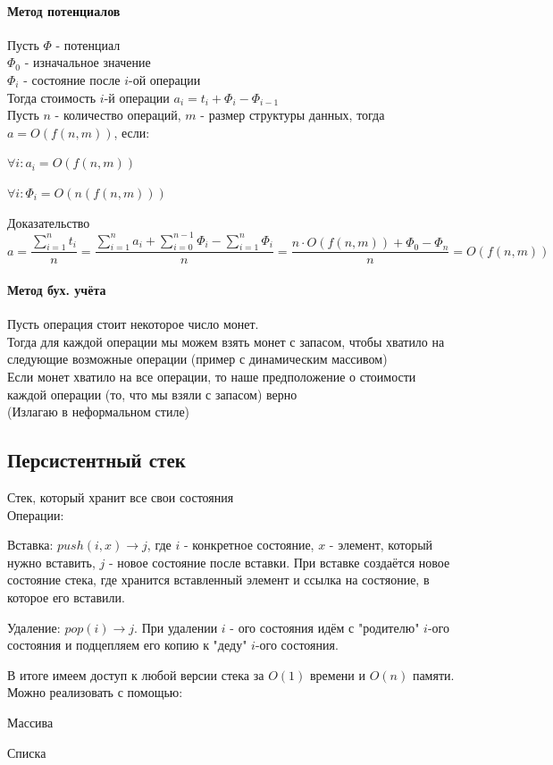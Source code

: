 \documentclass[a4paper,10pt]{article}
\begin{document}
	\paragraph{Метод потенциалов}
	Пусть $\Phi$ - потенциал \\
	$\Phi_{0}$ - изначальное значение \\
	$\Phi_{i}$ - состояние после $i$-ой операции \\
	Тогда стоимость $i$-й операции $a_{i} = t_{i} + \Phi_{i} - \Phi_{i-1}$ \\
	Пусть $n$ - количество операций, $m$ - размер структуры данных, тогда $a = O(f(n,m))$, если: \\
	\begin{center}
		\item $\forall i \colon a_{i} = O(f(n,m))$
		\item $\forall i \colon \Phi_{i} = O(n(f(n,m)))$
	\end{center}
	Доказательство \\
	\[
		a = \frac{\sum_{i=1}^{n} t_{i}}{n} = \frac{\sum_{i = 1}^{n} a_{i} + \sum_{i = 0}^{n-1} \Phi_{i} - \sum_{i = 1}^{n} \Phi_{i}}{n} = \frac {n \cdot O(f(n,m)) + \Phi_{0} - \Phi_{n}}{n} = O(f(n,m))
	\]
	\paragraph{Метод бух. учёта}
	Пусть операция стоит некоторое число монет. \\
	Тогда для каждой операции мы можем взять монет с запасом, чтобы хватило на следующие возможные операции (пример с динамическим массивом) \\
	Если монет хватило на все операции, то наше предположение о стоимости каждой операции (то, что мы взяли с запасом) верно \\
	(Излагаю в неформальном стиле) \\
	\subsection{Персистентный стек}
	Стек, который хранит все свои состояния \\
	Операции:
	\begin{center}
		\item Вставка: $push(i,x) \rightarrow j$, где $i$ - конкретное состояние, $x$ - элемент, который нужно вставить, $j$ - новое состояние после вставки. При вставке создаётся новое состояние стека, где хранится вставленный элемент и ссылка на состяоние, в которое его вставили.
		\item Удаление: $pop(i) \rightarrow j$. При удалении $i$ - ого состояния идём с "родителю" $i$-ого состояния и подцепляем его копию к "деду" $i$-ого состояния.
	\end{center}
	В итоге имеем доступ к любой версии стека за $O(1)$ времени и $O(n)$ памяти. \\
	Можно реализовать с помощью:
	\begin{center}
		\item Массива
		\item Списка
	\end{center}
\end{document}
